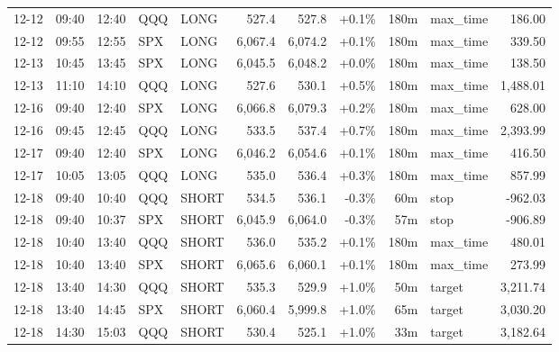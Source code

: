 \documentclass[11pt,a4paper,twoside]{article}
\begin{document}
\begin{center}
\begin{longtable}{>{\color{txtmain}}l l l l l r r r r >{\color{txtmain}}l r}
12-12 & 09:40 & 12:40 & QQQ & LONG & 527.4 & 527.8 & \textcolor{wingreen}{+0.1\%} & 180m & max\_time & \textcolor{wingreen}{186.00} \\
12-12 & 09:55 & 12:55 & SPX & LONG & 6,067.4 & 6,074.2 & \textcolor{wingreen}{+0.1\%} & 180m & max\_time & \textcolor{wingreen}{339.50} \\
12-13 & 10:45 & 13:45 & SPX & LONG & 6,045.5 & 6,048.2 & \textcolor{wingreen}{+0.0\%} & 180m & max\_time & \textcolor{wingreen}{138.50} \\
12-13 & 11:10 & 14:10 & QQQ & LONG & 527.6 & 530.1 & \textcolor{wingreen}{+0.5\%} & 180m & max\_time & \textcolor{wingreen}{1,488.01} \\
12-16 & 09:40 & 12:40 & SPX & LONG & 6,066.8 & 6,079.3 & \textcolor{wingreen}{+0.2\%} & 180m & max\_time & \textcolor{wingreen}{628.00} \\
12-16 & 09:45 & 12:45 & QQQ & LONG & 533.5 & 537.4 & \textcolor{wingreen}{+0.7\%} & 180m & max\_time & \textcolor{wingreen}{2,393.99} \\
12-17 & 09:40 & 12:40 & SPX & LONG & 6,046.2 & 6,054.6 & \textcolor{wingreen}{+0.1\%} & 180m & max\_time & \textcolor{wingreen}{416.50} \\
12-17 & 10:05 & 13:05 & QQQ & LONG & 535.0 & 536.4 & \textcolor{wingreen}{+0.3\%} & 180m & max\_time & \textcolor{wingreen}{857.99} \\
12-18 & 09:40 & 10:40 & QQQ & SHORT & 534.5 & 536.1 & \textcolor{lossred}{-0.3\%} & 60m & stop & \textcolor{lossred}{-962.03} \\
12-18 & 09:40 & 10:37 & SPX & SHORT & 6,045.9 & 6,064.0 & \textcolor{lossred}{-0.3\%} & 57m & stop & \textcolor{lossred}{-906.89} \\
12-18 & 10:40 & 13:40 & QQQ & SHORT & 536.0 & 535.2 & \textcolor{wingreen}{+0.1\%} & 180m & max\_time & \textcolor{wingreen}{480.01} \\
12-18 & 10:40 & 13:40 & SPX & SHORT & 6,065.6 & 6,060.1 & \textcolor{wingreen}{+0.1\%} & 180m & max\_time & \textcolor{wingreen}{273.99} \\
12-18 & 13:40 & 14:30 & QQQ & SHORT & 535.3 & 529.9 & \textcolor{wingreen}{+1.0\%} & 50m & target & \textcolor{wingreen}{3,211.74} \\
12-18 & 13:40 & 14:45 & SPX & SHORT & 6,060.4 & 5,999.8 & \textcolor{wingreen}{+1.0\%} & 65m & target & \textcolor{wingreen}{3,030.20} \\
12-18 & 14:30 & 15:03 & QQQ & SHORT & 530.4 & 525.1 & \textcolor{wingreen}{+1.0\%} & 33m & target & \textcolor{wingreen}{3,182.64} \\

\end{longtable}
\end{center}
\end{document}
